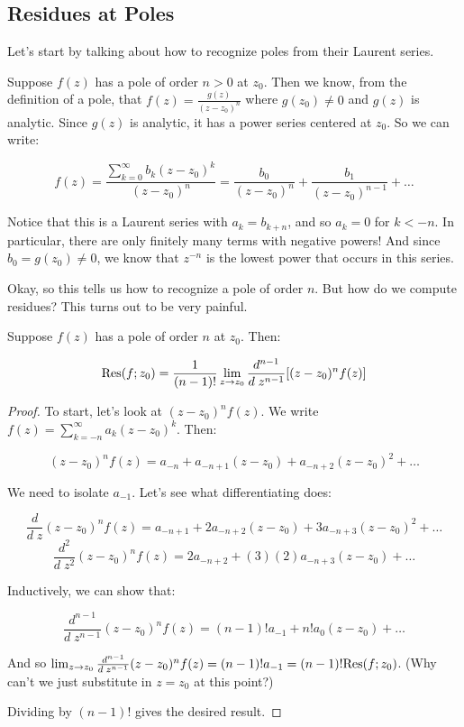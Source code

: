 \subsection{Residues at Poles}

Let's start by talking about how to recognize poles from their Laurent series.

Suppose $f(z)$ has a pole of order $n > 0$ at $z_0$. Then we know, from the definition of a pole, that $f(z) = \frac{g(z)}{(z-z_0)^n}$ where $g(z_0)\ne 0$ and $g(z)$ is analytic. Since $g(z)$ is analytic, it has a power series centered at $z_0$. So we can write:

$$f(z) = \frac{\sum_{k = 0}^\infty b_k(z-z_0)^k}{(z-z_0)^n} = \frac{b_0}{(z-z_0)^n} + \frac{b_1}{(z-z_0)^{n-1}} + \dots$$

Notice that this is a Laurent series with $a_k = b_{k + n}$, and so $a_k = 0$ for $k < -n$. In particular, there are only finitely many terms with negative powers! And since $b_0 = g(z_0)\ne 0$, we know that $z^{-n}$ is the lowest power that occurs in this series.

Okay, so this tells us how to recognize a pole of order $n$. But how do we compute residues? This turns out to be very painful.

\begin{thmbo}{}{} Suppose $f(z)$ has a pole of order $n$ at $z_0$. Then:

$$\mathrm{Res}(f;z_0) = \frac{1}{(n-1)!}\lim_{z\rightarrow z_0} \frac{d^{n-1}}{d\;z^{n-1}} [(z-z_0)^nf(z)]$$
\end{thmbo}

\begin{proof} To start, let's look at $(z-z_0)^nf(z)$. We write $f(z) = \sum_{k = -n}^\infty a_k(z-z_0)^k$. Then:

$$(z-z_0)^nf(z) = a_{-n} + a_{-n+1}(z-z_0) + a_{-n+2}(z-z_0)^2+\dots$$

We need to isolate $a_{-1}$. Let's see what differentiating does:

$$\frac{d}{d\;z} (z-z_0)^nf(z) = a_{-n+1} + 2a_{-n+2}(z-z_0) + 3a_{-n+3}(z-z_0)^2 + \dots$$
$$\frac{d^2}{d\;z^2} (z-z_0)^nf(z) = 2a_{-n+2} + (3)(2)a_{-n+3}(z-z_0) + \dots$$

Inductively, we can show that:

$$\frac{d^{n-1}}{d\;z^{n-1}} (z-z_0)^nf(z) = (n-1)! a_{-1} + n!a_{0}(z-z_0) + \dots$$

And so $\lim_{z\rightarrow z_0} \frac{d^{n-1}}{d\;z^{n-1}} (z-z_0)^nf(z) = (n-1)!a_{-1} = (n-1)!\mathrm{Res}(f;z_0)$. (Why can't we just substitute in $z = z_0$ at this point?)

Dividing by $(n-1)!$ gives the desired result.

\end{proof}

